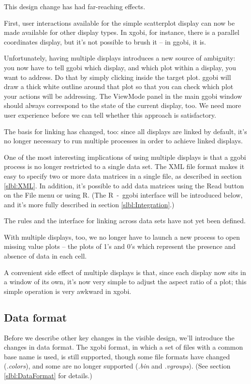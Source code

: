 \documentclass[11pt]{article}
\begin{document}
This design change has had far-reaching effects.

First, user interactions available for the simple scatterplot display
can now be made available for other display types.  In xgobi, for
instance, there is a parallel coordinates display, but it's not
possible to brush it -- in ggobi, it is. 

Unfortunately, having multiple displays introduces a new source of
ambiguity: you now have to tell ggobi which display, and which plot
within a display, you want to address.  Do that by simply clicking
inside the target plot.  ggobi will draw a thick white outline around
that plot so that you can check which plot your actions will be
addressing.  The ViewMode panel in the main ggobi window should
always correspond to the state of the current display, too.  We need
more user experience before we can tell whether this approach is
satisfactory.

The basis for linking has changed, too:  since all displays are
linked by default, it's no longer necessary to run multiple processes
in order to achieve linked displays.

One of the most interesting implications of using multiple displays
is that a ggobi process is no longer restricted to a single data
set.  The XML file format makes it easy to specify two or more data
matrices in a single file, as described in section \ref{slbl:XML}.
In addition, it's possible to add data matrices using the Read button
on the File menu or using R.  (The R~-~ggobi interface will be
introduced below, and it's more fully described in section
\ref{slbl:Integration}.)

The rules and the interface for linking across data sets have not yet
been defined.

With multiple displays, too, we no longer have to launch a new
process to open missing value plots -- the plots of 1's and 0's
which represent the presence and absence of data in each cell.

A convenient side effect of multiple displays is that, since each
display now sits in a window of its own, it's now very simple to
adjust the aspect ratio of a plot; this simple operation is very
awkward in xgobi.

\subsection {Data format}

Before we describe other key changes in the visible design, we'll
introduce the changes in data format.  The xgobi format, in which a
set of files with a common base name is used, is still supported,
though some file formats have changed ({\em .colors}), and some are
no longer supported ({\em .bin} and {\em .vgroups}).  (See section
\ref{slbl:DataFormat} for details.)
\end{document}
